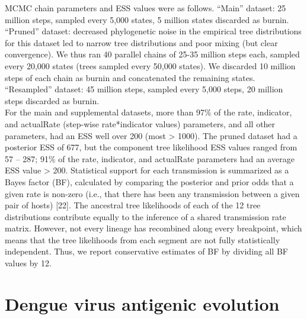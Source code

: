 MCMC chain parameters and ESS values were as follows.
“Main” dataset: 25 million steps, sampled every 5,000 states, 5 million states discarded as burnin.\\
“Pruned” dataset: decreased phylogenetic noise in the empirical tree distributions for this dataset led to narrow tree distributions and poor mixing (but clear convergence).
We thus ran 40 parallel chains of 25-35 million steps each, sampled every 20,000 states (trees sampled every 50,000 states).
We discarded 10 million steps of each chain as burnin and concatenated the remaining states. \\
“Resampled” dataset: 45 million steps, sampled every 5,000 steps, 20 million steps discarded as burnin. \\
For the main and supplemental datasets, more than 97\% of the rate, indicator, and actualRate (step-wise rate*indicator values) parameters, and all other parameters, had an ESS well over 200 (most > 1000). 
The pruned dataset had a posterior ESS of 677, but the component tree likelihood ESS values ranged from 57 – 287; 91\% of the rate, indicator, and actualRate parameters had an average ESS value > 200.
Statistical support for each transmission is summarized as a Bayes factor (BF), calculated by comparing the posterior and prior odds that a given rate is non-zero (i.e., that there has been any transmission between a given pair of hosts) [22].
The ancestral tree likelihoods of each of the 12 tree distributions contribute equally to the inference of a shared transmission rate matrix.
However, not every lineage has recombined along every breakpoint, which means that the tree likelihoods from each segment are not fully statistically independent.
Thus, we report conservative estimates of BF by dividing all BF values by 12.



\chapter{Dengue virus antigenic evolution}

